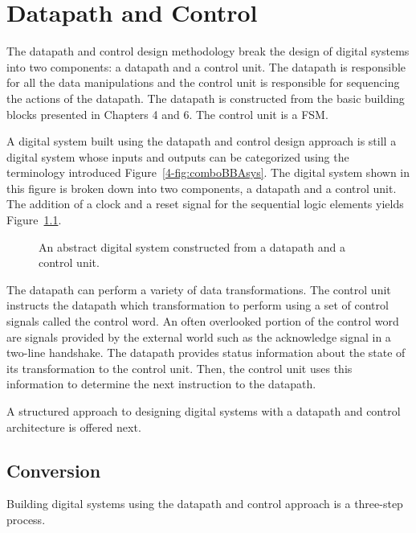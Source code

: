 \chapter{Datapath and Control}
\label{chapter:Datapath and Control}
\graphicspath{ {./chapter08/Fig} }

The datapath and control design methodology break the design
of digital systems into two components: a datapath and a control
unit.  The datapath is responsible for all the data manipulations
and the control unit is responsible for sequencing the
actions of the datapath.  The datapath is constructed from the basic
building blocks presented in Chapters 4 and 6.  The control unit is
a FSM.

A digital system built using the datapath and control design approach
is still a digital system whose inputs and outputs can be categorized
using the terminology introduced Figure~\ref{4-fig:comboBBAsys}.  The
digital system shown in this figure is broken down into two components,
a datapath and a control unit.  The addition of a clock and a reset signal for the
sequential logic elements yields Figure~\ref{fig:datapathControlAbstract}.

\begin{figure}[ht]
    \caption{An abstract digital system constructed from a datapath and
    a control unit.}
    \label{fig:datapathControlAbstract}
\end{figure}
\label{page:Abstract}

The datapath can perform a variety of data transformations.  The control
unit instructs the datapath which transformation to perform using a set
of control signals called the control word.  An often overlooked portion
of the control word are signals provided by the external world such as
the acknowledge signal in a two-line handshake.  The datapath
provides status information about the state of its transformation to the
control unit.  Then, the control unit uses this information to determine
the next instruction to the datapath.

A structured approach to designing digital systems with a
datapath and control architecture is offered next.

\section{Conversion}
Building digital systems using the datapath and control approach is a
three-step process.

